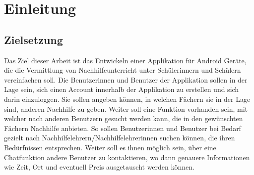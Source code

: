 \documentclass[../main.tex]{subfiles}
\begin{document}
\chapter{Einleitung}
\section{Zielsetzung}
Das Ziel dieser Arbeit ist das Entwickeln einer Applikation für Android Geräte, die die Vermittlung von Nachhilfeunterricht unter Schülerinnern und Schülern vereinfachen soll. Die Benutzerinnen und Benutzer der Applikation sollen in der Lage sein, sich einen Account innerhalb der Applikation zu erstellen und sich darin einzuloggen. Sie sollen angeben können, in welchen Fächern sie in der Lage sind, anderen Nachhilfe zu geben. Weiter soll eine Funktion vorhanden sein, mit welcher nach anderen Benutzern gesucht werden kann, die in den gewünschten Fächern Nachhilfe anbieten. So sollen Benutzerinnen und Benutzer bei Bedarf gezielt nach Nachhilfelehrern/Nachhilfelehrerinnen suchen können, die ihren Bedürfnissen entsprechen. Weiter soll es ihnen möglich sein, über eine Chatfunktion andere Benutzer zu kontaktieren, wo dann genauere Informationen wie Zeit, Ort und eventuell Preis ausgetauscht werden können.
\end{document}
